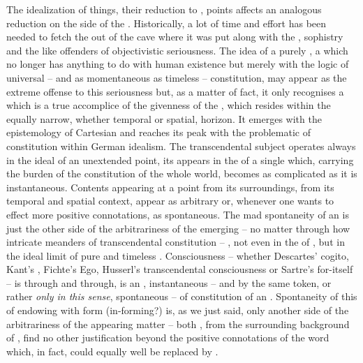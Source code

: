 \pa The idealization of {things}, their reduction to ,
 points affects an analogous reduction on the side of the
. Historically, a lot of time and  effort has been
needed to fetch the  out of the cave where it was put along with the
, sophistry and the like offenders of objectivistic
seriousness.  The idea of a purely , a  which
no longer has anything to do with human existence but merely with the logic of
universal -- and as momentaneous as timeless -- constitution, may appear as the
extreme offense to this seriousness but, as a matter of fact, it only recognises
a  which is a true accomplice of the  givenness of the
, which resides within the equally narrow, whether temporal or spatial,
horizon.  It emerges with the epistemology of Cartesian  and reaches
its peak with the problematic of constitution within German idealism.  The
transcendental subject operates always in the ideal  of an
unextended point, its  appears in the  of a single
 which, carrying the burden of the constitution of the whole world,
becomes as complicated as it is instantaneous.  Contents appearing at a point
 from its surroundings, from its temporal and spatial context,
appear as arbitrary or, whenever one wants to effect more positive connotations,
as spontaneous.  The mad spontaneity of an   is just
the other side of the arbitrariness of the  emerging -- no matter
through how intricate meanders of transcendental constitution -- ,
not even in the  of \herenow, but in the ideal limit of pure and
timeless .  Consciousness -- whether Descartes' cogito, Kant's
, Fichte's Ego, Husserl's transcendental consciousness or Sartre's
for-itself -- is  through and through, is an ,
instantaneous -- and by the same token, or rather {\em only in this sense},
spontaneous --  of constitution of an .  Spontaneity of this
 of endowing with form (in-forming?) is, as we just said, only another
side of the arbitrariness of the appearing matter -- both ,
 from the surrounding background of , find no
other justification beyond the positive connotations of the word
 which, in fact, could equally well be replaced by
.


